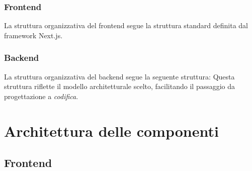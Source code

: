 \documentclass[10pt, a4paper]{article}
\begin{document}
\subsubsection{Frontend}
La struttura organizzativa del frontend segue la struttura standard definita dal framework Next.js.

\subsubsection{Backend}
La struttura organizzativa del backend segue la seguente struttura:
Questa struttura riflette il modello architetturale scelto, facilitando il passaggio da progettazione a \textit{codifica\pg}.


\newpage
\section{Architettura delle componenti}
\subsection{Frontend}
\end{document}
